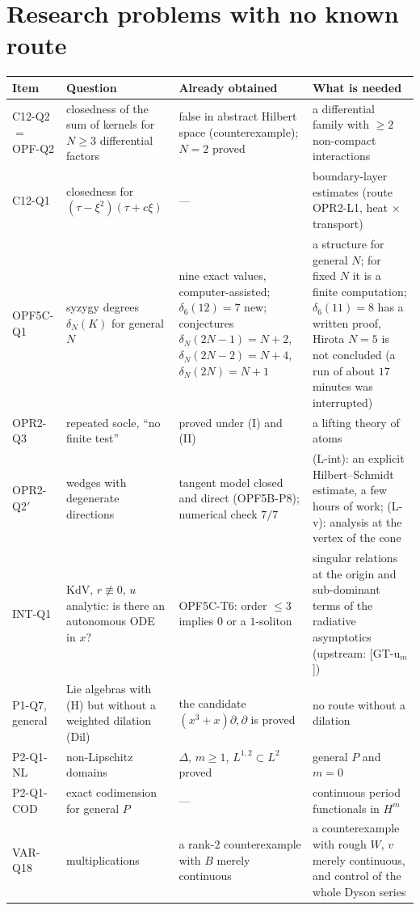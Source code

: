 \section{Research problems with no known route}

\begin{center}\small
\begin{longtable}{@{}L{2.5cm}L{4.0cm}L{4.2cm}L{4.0cm}@{}}
\toprule
Item & Question & Already obtained & What is needed\\\midrule\endhead
C12-Q2 $=$ OPF-Q2 & closedness of the sum of kernels for $N\ge3$ differential factors & false in abstract Hilbert space (counterexample); $N=2$ proved & a differential family with $\ge2$ non-compact interactions\\
C12-Q1 & closedness for $(\tau-\xi^2)(\tau+c\xi)$ & --- & boundary-layer estimates (route OPR2-L1, heat $\times$ transport)\\
OPF5C-Q1 & syzygy degrees $\delta_N(K)$ for general $N$ & nine exact values, computer-assisted; $\delta_6(12)=7$ new; conjectures $\delta_N(2N-1)=N+2$, $\delta_N(2N-2)=N+4$, $\delta_N(2N)=N+1$ & a structure for general $N$; for fixed $N$ it is a finite computation; $\delta_6(11)=8$ has a written proof, Hirota $N=5$ is not concluded (a run of about $17$ minutes was interrupted)\\
OPR2-Q3 & repeated socle, ``no finite test'' & proved under (I) and (II) & a lifting theory of atoms\\
OPR2-Q2$'$ & wedges with degenerate directions & tangent model closed and direct (OPF5B-P8); numerical check $7/7$ & (L-int): an explicit Hilbert--Schmidt estimate, a few hours of work; (L-v): analysis at the vertex of the cone\\
INT-Q1 & KdV, $r\not\equiv0$, $u$ analytic: is there an autonomous ODE in $x$? & OPF5C-T6: order $\le3$ implies $0$ or a $1$-soliton & singular relations at the origin and sub-dominant terms of the radiative asymptotics (upstream: [GT-u$_m$])\\
P1-Q7, general & Lie algebras with (H) but without a weighted dilation (Dil) & the candidate $(x^3+x)\partial,\partial$ is proved & no route without a dilation\\
P2-Q1-NL & non-Lipschitz domains & $\Delta$, $m\ge1$, $L^{1,2}\subset L^2$ proved & general $P$ and $m=0$\\
P2-Q1-COD & exact codimension for general $P$ & --- & continuous period functionals in $H^m$\\
VAR-Q18 & multiplications & a rank-$2$ counterexample with $B$ merely continuous & a counterexample with rough $W$, $v$ merely continuous, and control of the whole Dyson series\\

\end{longtable}
\end{center}

